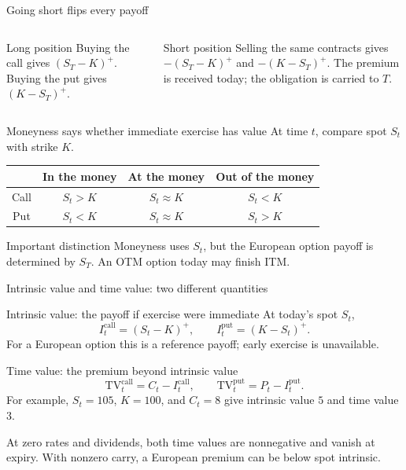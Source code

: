 \documentclass[handout,10pt,aspectratio=169]{beamer}
\newcommand{\1}{\mathbf 1}
\begin{document}
\begin{frame}{Going short flips every payoff}
\begin{columns}[T,onlytextwidth]
\begin{block}{Long position}
Buying the call gives \((S_T-K)^+\). Buying the put gives \((K-S_T)^+\).
\end{block}
\begin{alertblock}{Short position}
Selling the same contracts gives \(-(S_T-K)^+\) and \(-(K-S_T)^+\).
The premium is received today; the obligation is carried to \(T\).
\end{alertblock}
\end{columns}
\end{frame}

\begin{frame}{Moneyness says whether immediate exercise has value}
At time \(t\), compare spot \(S_t\) with strike \(K\).
\begin{center}
\begin{tabular}{c|ccc}
\toprule
 & In the money & At the money & Out of the money\\
\midrule
Call & \(S_t>K\) & \(S_t\approx K\) & \(S_t<K\)\\
Put  & \(S_t<K\) & \(S_t\approx K\) & \(S_t>K\)\\
\bottomrule
\end{tabular}
\end{center}
\begin{block}{Important distinction}
Moneyness uses \(S_t\), but the European option payoff is determined by
\(S_T\). An OTM option today may finish ITM.
\end{block}
\end{frame}

\begin{frame}{Intrinsic value and time value: two different quantities}
\begin{block}{Intrinsic value: the payoff if exercise were immediate}
At today's spot \(S_t\),
\[
I_t^{\mathrm{call}}=(S_t-K)^+,
\qquad I_t^{\mathrm{put}}=(K-S_t)^+.
\]
For a European option this is a reference payoff; early exercise is unavailable.
\end{block}
\begin{exampleblock}{Time value: the premium beyond intrinsic value}
\[
\boxed{\mathrm{TV}_t^{\mathrm{call}}=C_t-I_t^{\mathrm{call}},
\qquad \mathrm{TV}_t^{\mathrm{put}}=P_t-I_t^{\mathrm{put}}.}
\]
For example, \(S_t=105\), \(K=100\), and \(C_t=8\) give intrinsic value
\(5\) and time value \(3\).
\end{exampleblock}
At zero rates and dividends, both time values are nonnegative and vanish
at expiry. With nonzero carry, a European premium can be below spot intrinsic.
\end{frame}
\end{document}
